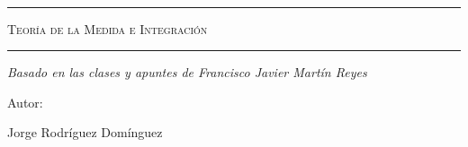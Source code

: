 \begin{titlepage}
    \centering
    {\bfseries\LARGE \ \par}
    \vspace{1cm}{\scshape\Large \ \par}
    \vspace{3cm}
    \rule{\linewidth}{0.5mm}
    {\scshape\Huge Teoría de la Medida e Integración \par}
    \rule{\linewidth}{0.5mm} \par
    \vspace{3cm}
    {\itshape\Large Basado en las clases y apuntes de Francisco Javier Martín Reyes \par}
    \vfill
    {\Large Autor: \par}
    {\Large Jorge Rodríguez Domínguez \par}
    \vfill
\end{titlepage}

\tableofcontents